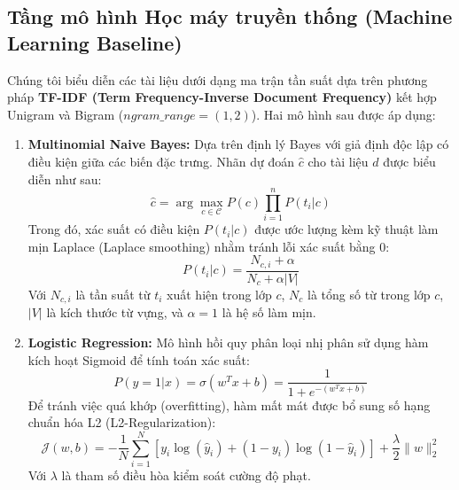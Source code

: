 \documentclass[12pt,a4paper]{article}
\begin{document}
\subsection{Tầng mô hình Học máy truyền thống (Machine Learning Baseline)}
Chúng tôi biểu diễn các tài liệu dưới dạng ma trận tần suất dựa trên phương pháp \textbf{TF-IDF (Term Frequency-Inverse Document Frequency)} kết hợp Unigram và Bigram ($ngram\_range=(1, 2)$). Hai mô hình sau được áp dụng:
\begin{enumerate}
    \item \textbf{Multinomial Naive Bayes:} Dựa trên định lý Bayes với giả định độc lập có điều kiện giữa các biến đặc trưng. Nhãn dự đoán $\hat{c}$ cho tài liệu $d$ được biểu diễn như sau:
    \begin{equation}
        \hat{c} = \arg\max_{c \in \mathcal{C}} P(c) \prod_{i=1}^{n} P(t_i | c)
    \end{equation}
    Trong đó, xác suất có điều kiện $P(t_i | c)$ được ước lượng kèm kỹ thuật làm mịn Laplace (Laplace smoothing) nhằm tránh lỗi xác suất bằng 0:
    \begin{equation}
        P(t_i | c) = \frac{N_{c, i} + \alpha}{N_c + \alpha |V|}
    \end{equation}
    Với $N_{c, i}$ là tần suất từ $t_i$ xuất hiện trong lớp $c$, $N_c$ là tổng số từ trong lớp $c$, $|V|$ là kích thước từ vựng, và $\alpha = 1$ là hệ số làm mịn.
    
    \item \textbf{Logistic Regression:} Mô hình hồi quy phân loại nhị phân sử dụng hàm kích hoạt Sigmoid để tính toán xác suất:
    \begin{equation}
        P(y=1|x) = \sigma(w^T x + b) = \frac{1}{1 + e^{-(w^T x + b)}}
    \end{equation}
    Để tránh việc quá khớp (overfitting), hàm mất mát được bổ sung số hạng chuẩn hóa L2 (L2-Regularization):
    \begin{equation}
        \mathcal{J}(w, b) = -\frac{1}{N} \sum_{i=1}^{N} \left[ y_i \log(\hat{y}_i) + (1-y_i)\log(1-\hat{y}_i) \right] + \frac{\lambda}{2} \|w\|_2^2
    \end{equation}
    Với $\lambda$ là tham số điều hòa kiểm soát cường độ phạt.
\end{enumerate}
\end{document}
